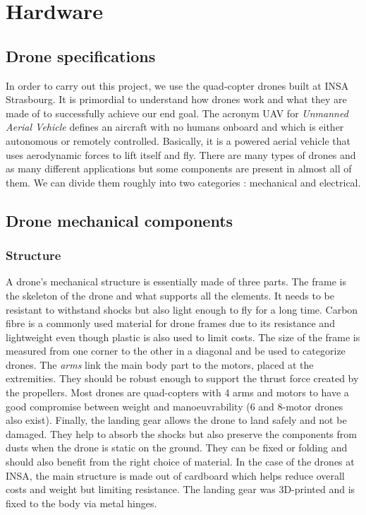 \chapter{Hardware}

\section{Drone specifications}

In order to carry out this project, we use the quad-copter drones built at INSA Strasbourg. It is primordial to understand how drones work and what they are made of to successfully achieve our end goal. The acronym UAV for \textit{Unmanned Aerial Vehicle} defines an aircraft with no humans onboard and which is either autonomous or remotely controlled. Basically, it is a powered aerial vehicle that uses aerodynamic forces to lift itself and fly. There are many types of drones and as many different applications but some components are present in almost all of them. We can divide them roughly into two categories : mechanical and electrical.


\section{Drone mechanical components}

\subsection{Structure}

A drone's mechanical structure is essentially made of three parts. The frame is the skeleton of the drone and what supports all the elements. It needs to be resistant to withstand shocks but also light enough to fly for a long time. Carbon fibre is a commonly used material for drone frames due to its resistance and lightweight even though plastic is also used to limit costs. The size of the frame is measured from one corner to the other in a diagonal and be used to categorize drones. The \textit{arms} link the main body part to the motors, placed at the extremities. They should be robust enough to support the thrust force created by the propellers. Most drones are quad-copters with 4 arms and motors to have a good compromise between weight and manoeuvrability (6 and 8-motor drones also exist). Finally, the landing gear allows the drone to land safely and not be damaged. They help to absorb the shocks but also preserve the components from dusts when the drone is static on the ground. They can be fixed or folding and should also benefit from the right choice of material. In the case of the drones at INSA, the main structure is made out of cardboard which helps reduce overall costs and weight but limiting resistance. The landing gear was 3D-printed and is fixed to the body via metal hinges. 

